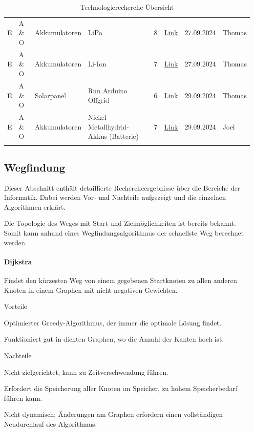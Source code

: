 \documentclass[../main.tex]{subfiles}
\begin{document}
\begin{longtable}{lp{2cm}p{2cm}p{4cm}clcl}
\tabularnewline
E & A \& O & Akkumulatoren & LiPo & 8 & \href{https://www.lion-care.com/lipo-akkus-eigenschaften-vorteile-und-mehr}{Link} & 27.09.2024 & Thomas
\tabularnewline
E & A \& O & Akkumulatoren & Li-Ion & 7 & \href{https://poleenergy.ch/shop_content.php?coID=32}{Link} & 27.09.2024 & Thomas
\tabularnewline
E & A \& O & Solarpanel & Run Arduino Offgrid & 6 & \href{https://voltaicsystems.com/solar-arduino-guide/}{Link} & 29.09.2024 & Thomas
\tabularnewline
E & A \& O & Akkumulatoren & Nickel-Metallhydrid-Akkus \newline (Batterie) & 7 & \href{https://voltaicsystems.com/solar-arduino-guide/}{Link} & 29.09.2024 & Joel
\tabularnewline
\caption{Technologierecherche Übersicht}
\label{tab:technologierecherche}
\end{longtable}
\normalsize




\newpage
\subsection{Wegfindung}

Dieser Abschnitt enthält detaillierte Rechercheergebnisse über die Bereiche der Informatik. Dabei werden Vor- und Nachteile aufgezeigt und die einzelnen Algorithmen erklärt.

Die Topologie des Weges mit Start und Zielmöglichkeiten ist bereits bekannt.
Somit kann anhand eines Wegfindungsalgorithmus der schnellste Weg berechnet werden.

\paragraph{Dijkstra}

Findet den kürzesten Weg von einem gegebenen Startknoten zu allen anderen Knoten in einem Graphen mit nicht-negativen Gewichten.

\begin{minipage}[t]{0.48\textwidth}
\begin{items}
  \item [Vorteile]
  \item Optimierter Greedy-Algorithmus, der immer die optimale Lösung findet.
  \item Funktioniert gut in dichten Graphen, wo die Anzahl der Kanten hoch ist.
\end{items}
\end{minipage}
\hfill
\begin{minipage}[t]{0.48\textwidth}
\begin{items}
  \item [Nachteile]
  \item Nicht zielgerichtet, kann zu Zeitverschwendung führen.
  \item Erfordert die Speicherung aller Knoten im Speicher, zu hohem Speicherbedarf führen kann.
  \item Nicht dynamisch; Änderungen am Graphen erfordern einen vollständigen Neudurchlauf des Algorithmus.
\end{items}
\end{minipage}
\end{document}
